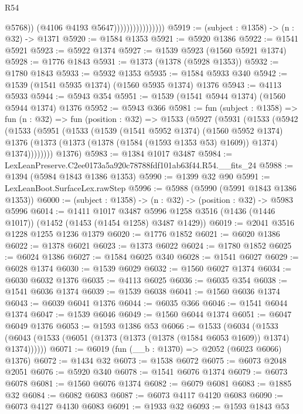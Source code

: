 \begin{lexlean}{R54}
\begin{coremodule}
                                      @5768))
                                  (@4106 @4193 @5647))))))))))))))))
@5919 := (subject : @1358) -> (n : @32) -> @1371
@5920 := @1584 @1353
@5921 := @5920 @1386
@5922 := @1541 @5921
@5923 := @5922 @1374
@5927 := @1539 @5923 (@1560 @5921 @1374)
@5928 := @1776 @1843
@5931 := @1373 (@1378 (@5928 @1353))
@5932 := @1780 @1843
@5933 := @5932 @1353
@5935 := @1584 @5933 @340
@5942 := @1539 (@1541 @5935 @1374) (@1560 @5935 @1374) @1376
@5943 := @4113 @5933
@5944 := @5943 @354
@5951 := @1539 (@1541 @5944 @1374) (@1560 @5944 @1374) @1376
@5952 := @5943 @366
@5981 := fun (subject : @1358) =>
  fun (n : @32) =>
  fun (position : @32) =>
  @1533
    (@5927
      (@5931
        (@1533
          (@5942
            (@1533
              (@5951
                (@1533
                  (@1539
                    (@1541 @5952 @1374)
                    (@1560 @5952 @1374)
                    @1376
                    (@1373 (@1373 (@1378 (@1584 (@1593 @1353 @53) @1609)) @1374) @1374))))))))
      @1376)
@5983 := @1384 @1017 @3487
@5984 := LexLeanPreserve.C2ee0173a5a920c78788fdf101ab63f44.R54.__fits_24
@5988 := @1394 (@5984 @1843 @1386 @1353)
@5990 := @1399 @32 @90
@5991 := LexLeanBoot.SurfaceLex.rawStep
@5996 := @5988 (@5990 (@5991 @1843 @1386 @1353))
@6000 := (subject : @1358) -> (n : @32) -> (position : @32) -> @5983 @5996
@6014 := @1411
    @1017
    @3487
    @5996
    @1258
    @3516
    (@1436 (@1446 @1017))
    (@1452 (@1453 (@1454 @1258) @3487 @1429))
@6019 := @2041 @3516 @1228 @1255 @1236 @1379
@6020 := @1776 @1852
@6021 := @6020 @1386
@6022 := @1378 @6021
@6023 := @1373 @6022
@6024 := @1780 @1852
@6025 := @6024 @1386
@6027 := @1584 @6025 @340
@6028 := @1541 @6027
@6029 := @6028 @1374
@6030 := @1539 @6029
@6032 := @1560 @6027 @1374
@6034 := @6030 @6032 @1376
@6035 := @4113 @6025
@6036 := @6035 @354
@6038 := @1541 @6036 @1374
@6039 := @1539 @6038
@6041 := @1560 @6036 @1374
@6043 := @6039 @6041 @1376
@6044 := @6035 @366
@6046 := @1541 @6044 @1374
@6047 := @1539 @6046
@6049 := @1560 @6044 @1374
@6051 := @6047 @6049 @1376
@6053 := @1593 @1386 @53
@6066 := @1533
    (@6034 (@1533 (@6043 (@1533 (@6051 (@1373 (@1373 (@1378 (@1584 @6053 @1609)) @1374) @1374))))))
@6071 := @6019 (fun (__b : @1370) => @2052 (@6023 @6066) @1376)
@6072 := @1434 @32
@6073 := @1538 @6072
@6075 := @6073 @2048 @2051
@6076 := @5920 @340
@6078 := @1541 @6076 @1374
@6079 := @6073 @6078
@6081 := @1560 @6076 @1374
@6082 := @6079 @6081
@6083 := @1885 @32
@6084 := @6082 @6083
@6087 := @6073 @4117 @4120 @6083
@6090 := @6073 @4127 @4130 @6083
@6091 := @1933 @32
@6093 := @1593 @1843 @53

\end{coremodule}
\end{lexlean}
